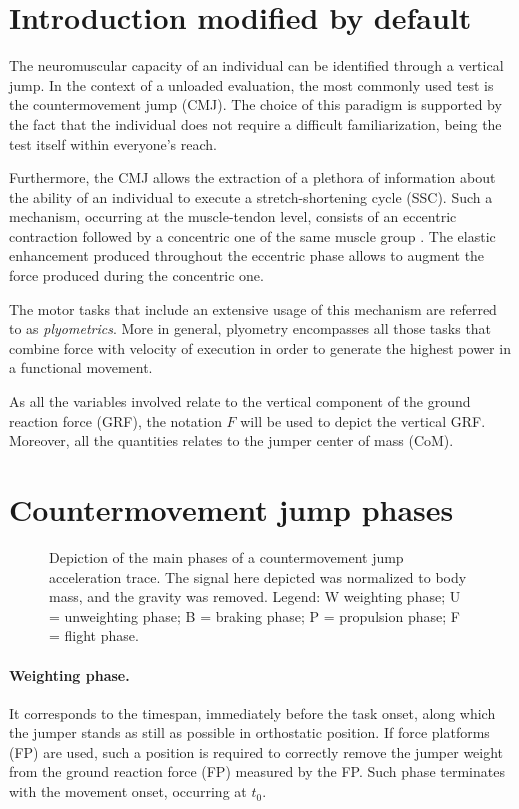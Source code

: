 \section{Introduction modified by default}
The neuromuscular capacity of an individual can be identified through a vertical jump. In the context of a unloaded evaluation, the most commonly used test is the countermovement jump (CMJ). The choice of this paradigm is supported by the fact that the individual does not require a difficult familiarization, being the test itself within everyone's reach. 

Furthermore, the CMJ allows the extraction of a plethora of information about the ability of an individual to execute a stretch-shortening cycle (SSC). Such a mechanism, occurring at the muscle-tendon level, consists of an eccentric contraction followed by a concentric one of the same muscle group \citep{neumann_kelly_kiefer_martens_grosz_2017}. The elastic enhancement produced throughout the eccentric phase allows to augment the force produced during the concentric one. 

The motor tasks that include an extensive usage of this mechanism are referred to as \textit{plyometrics}. More in general, plyometry encompasses all those tasks that combine force with velocity of execution in order to generate the highest power in a functional movement. 

As all the variables involved relate to the vertical component of the ground reaction force (GRF), the notation $F$ will be used to depict the vertical GRF. Moreover, all the quantities relates to the jumper center of mass (CoM). 

\section{Countermovement jump phases}

\begin{figure}[ht]
\centering

\caption{Depiction of the main phases of a countermovement jump acceleration trace. The signal here depicted was normalized to body mass, and the gravity was removed. Legend: W weighting phase; U = unweighting phase; B = braking phase; P = propulsion phase; F = flight phase.}
\label{fig:cmj_phases}
\end{figure}

\paragraph{Weighting phase.} It corresponds to the timespan, immediately before the task onset, along which the jumper stands as still as possible in orthostatic position. If force platforms (FP) are used, such a position is required to correctly remove the jumper weight from the ground reaction force (FP) measured by the FP. Such phase terminates with the movement onset, occurring at $t_0$. 

